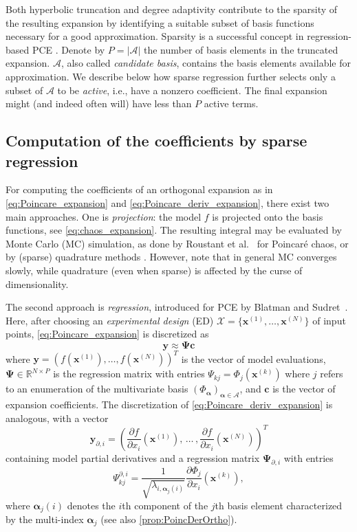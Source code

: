 \documentclass[a4paper,11pt]{article}
\newcommand{\curlyA}{{\mathcal A}}
\newcommand{\cx}{{\mathcal X}}
\newcommand{\Rr}{{\mathbb R}}
\newcommand{\ve}[1]{\boldsymbol{#1}}
\newcommand{\enum}{ , \, \dots \,,}
\newcommand{\alp}{{\ve{\alpha}}}
\newcommand{\Phal}{\Phi_{\alp}}
\renewcommand{\citep}[2][]{\cite[#1]{#2}}
\theoremstyle{definition}
\theoremstyle{remark}
\theoremstyle{theorem}
\begin{document}
Both hyperbolic truncation and degree adaptivity contribute to the sparsity of the resulting expansion by identifying a suitable subset of basis functions necessary for a good approximation.
Sparsity is a successful concept in regression-based PCE \citep{LuethenSIAMJUQ2020}.
Denote by $P = |\curlyA|$ the number of basis elements in the truncated expansion.
$\curlyA$, also called \textit{candidate basis}, contains the basis elements available for approximation.
We describe below how sparse regression further selects only a subset of $\curlyA$ to be \textit{active}, i.e., have a nonzero coefficient. The final expansion might (and indeed often will) have less than $P$ active terms.


\subsection{Computation of the coefficients by sparse regression}
\label{sec:sparse_regression}
For computing the coefficients of an orthogonal expansion as in \eqref{eq:Poincare_expansion} and \eqref{eq:Poincare_deriv_expansion}, there exist two main approaches. 
One is \textit{projection}: the model $f$ is projected onto the basis functions, see \eqref{eq:chaos_expansion}. 
The resulting integral may be evaluated by Monte Carlo (MC) simulation, as done by Roustant et al.~\cite{rougam20} for Poincar\'e chaos, or by (sparse) quadrature methods \citep{LeMaitre2002, Matthies2005, Constantine2012}. However, note that in general MC converges slowly, while quadrature (even when sparse) is affected by the curse of dimensionality.

The second approach is \textit{regression}, introduced for PCE by Blatman and Sudret~\cite{BlatmanCras2008}. Here, after choosing an \textit{experimental design} (ED) $\cx = \{\ve x^{(1)}, \ldots , \ve x^{(N)}\}$ of input points, \eqref{eq:Poincare_expansion} is discretized as
\begin{equation}
\ve y \approx \ve\Psi \ve c
\end{equation}
where $\ve y = (f(\ve x^{(1)}), \ldots, f(\ve x^{(N)}))^T$ is the vector of model evaluations, $\ve\Psi \in \Rr^{N\times P}$ is the regression matrix with entries
$
\Psi_{kj} = \Phi_{j}(\ve x^{(k)})
$
where $j$ refers to an enumeration of the multivariate basis $(\Phal)_{\alp\in\curlyA}$, and $\ve c$ is the vector of expansion coefficients. 
The discretization of \eqref{eq:Poincare_deriv_expansion} is analogous, with a vector 
\begin{equation}
\ve y_{\partial, i} = \left( \frac{\partial f}{\partial x_i}(\ve x^{(1)}) \enum  \frac{\partial f}{\partial x_i}(\ve x^{(N)}) \right)^T
\label{eq:regression_deriv_rhs}
\end{equation}
containing model partial derivatives and a regression matrix $\ve\Psi_{\partial,i}$ with entries 
\begin{equation}
\Psi^{\partial,i}_{kj} = \frac{1}{\sqrt{\lambda_{i, \alp_j(i)}}}\frac{\partial \Phi_{j}}{\partial x_i} (\ve x^{(k)}),
\label{eq:regression_deriv_regrmatrix}
\end{equation}
where $\alp_j(i)$ denotes the $i$th component of the $j$th basis element characterized by the multi-index $\alp_j$ (see also \cref{prop:PoincDerOrtho}).
\end{document}
